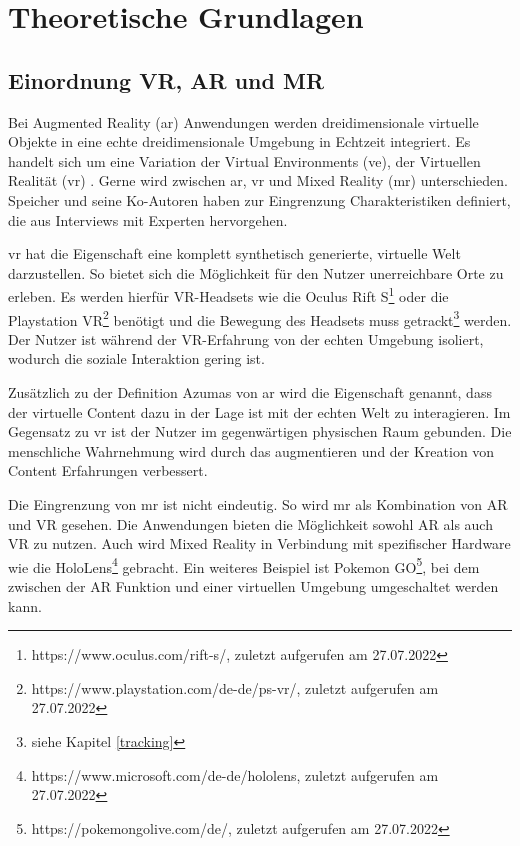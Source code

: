 \section{Theoretische Grundlagen}
\subsection {Einordnung VR, AR und MR}
Bei Augmented Reality (\acrshort{ar}) Anwendungen werden dreidimensionale virtuelle Objekte in eine echte dreidimensionale Umgebung in Echtzeit integriert. Es handelt sich um eine Variation der Virtual Environments (\acrshort{ve}), der Virtuellen Realität (\acrshort{vr}) \cite{Azuma1997}. Gerne wird zwischen \acrshort{ar}, \acrshort{vr} und Mixed Reality (\acrshort{mr}) unterschieden. Speicher und seine Ko-Autoren \cite*{Speicher2019} haben zur Eingrenzung Charakteristiken definiert, die aus Interviews mit Experten hervorgehen. 

\acrshort{vr} hat die Eigenschaft eine komplett synthetisch generierte, virtuelle Welt darzustellen. So bietet sich die Möglichkeit für den Nutzer unerreichbare Orte zu erleben. Es werden hierfür VR-Headsets wie die Oculus Rift S\footnote{https://www.oculus.com/rift-s/, zuletzt aufgerufen am 27.07.2022} oder die Playstation VR\footnote{https://www.playstation.com/de-de/ps-vr/, zuletzt aufgerufen am 27.07.2022} benötigt und die Bewegung des Headsets muss getrackt\footnote{siehe Kapitel \ref{tracking} } werden. Der Nutzer ist während der VR-Erfahrung von der echten Umgebung isoliert, wodurch die soziale Interaktion gering ist. 

Zusätzlich zu der Definition Azumas\cite{Azuma1997} von \acrshort{ar} wird die Eigenschaft genannt, dass der virtuelle Content dazu in der Lage ist mit der echten Welt zu interagieren. Im Gegensatz zu \acrshort{vr} ist der Nutzer im gegenwärtigen physischen Raum gebunden. Die menschliche Wahrnehmung wird durch das augmentieren und der Kreation von Content Erfahrungen verbessert\cite{Speicher2019}.

Die Eingrenzung von \acrshort{mr} ist nicht eindeutig. So wird \acrshort{mr} als Kombination von AR und VR gesehen. Die Anwendungen bieten die Möglichkeit sowohl AR als auch VR zu nutzen. Auch wird Mixed Reality in Verbindung mit spezifischer Hardware wie die HoloLens\footnote{https://www.microsoft.com/de-de/hololens, zuletzt aufgerufen am 27.07.2022} gebracht. Ein weiteres Beispiel ist Pokemon GO\footnote{https://pokemongolive.com/de/, zuletzt aufgerufen am 27.07.2022}, bei dem zwischen der AR Funktion und einer virtuellen Umgebung umgeschaltet werden kann.

